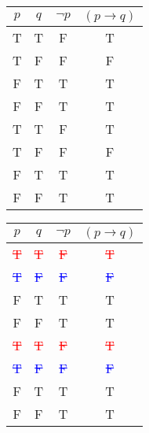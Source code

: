 \documentclass{article}
\begin{document}
\begin{enumerate}
          \begin{table}[h]
              \centering
              \begin{tabular}{|c|c||c|c|}
                  \hline
                  $p$ & $q$ & $\neg p$ & $(p \rightarrow q)$ \\ \hline
                  \hline
                  T   & T   & F        & T                   \\ \hline
                  T   & F   & F        & F                   \\ \hline
                  F   & T   & T        & T                   \\ \hline
                  F   & F   & T        & T                   \\ \hline
                  T   & T   & F        & T                   \\ \hline
                  T   & F   & F        & F                   \\ \hline
                  F   & T   & T        & T                   \\ \hline
                  F   & F   & T        & T                   \\ \hline
              \end{tabular}
              \quad
              \begin{tabular}{|c|c||c|c|}
                  \hline
                  $p$                        & $q$                        & $\neg p$                   & $(p \rightarrow q)$        \\ \hline
                  \hline
                  \textcolor{red}{\sout{T}}  & \textcolor{red}{\sout{T}}  & \textcolor{red}{\sout{F}}  & \textcolor{red}{\sout{T}}  \\ \hline
                  \textcolor{blue}{\sout{T}} & \textcolor{blue}{\sout{F}} & \textcolor{blue}{\sout{F}} & \textcolor{blue}{\sout{F}} \\ \hline
                  F                          & T                          & T                          & T                          \\ \hline
                  F                          & F                          & T                          & T                          \\ \hline
                  \textcolor{red}{\sout{T}}  & \textcolor{red}{\sout{T}}  & \textcolor{red}{\sout{F}}  & \textcolor{red}{\sout{T}}  \\ \hline
                  \textcolor{blue}{\sout{T}} & \textcolor{blue}{\sout{F}} & \textcolor{blue}{\sout{F}} & \textcolor{blue}{\sout{F}} \\ \hline
                  F                          & T                          & T                          & T                          \\ \hline
                  F                          & F                          & T                          & T                          \\ \hline
              \end{tabular}
          \end{table}


\end{enumerate}
\end{document}
